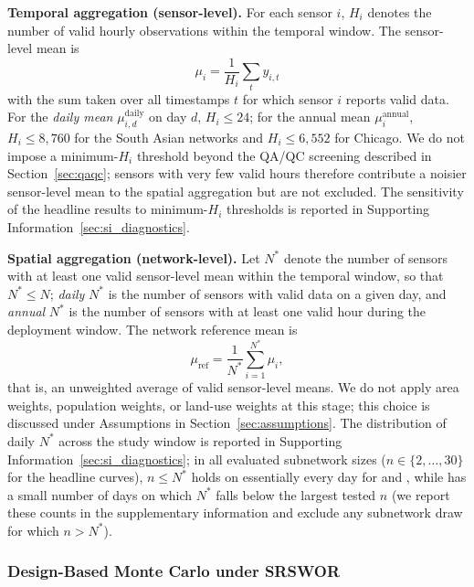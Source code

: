 \documentclass[12pt]{article}
\theoremstyle{remark}
\newcommand{\city}[1]{\capitalisewords{\MakeLowercase{#1}}}
\begin{document}
\textbf{Temporal aggregation (sensor-level).}
For each sensor $i$, $H_i$ denotes the number of valid hourly observations within the temporal window. The sensor-level mean is
\begin{equation}\label{eq:mu_sensor}
\mu_{i} = \frac{1}{H_i} \sum_{t} y_{i,t}
\end{equation}
with the sum taken over all timestamps $t$ for which sensor $i$ reports valid data. For the \emph{daily mean} $\mu_{i,d}^{\mathrm{daily}}$ on day $d$, $H_i \le 24$; for the annual mean $\mu_i^{\mathrm{annual}}$, $H_i \le 8{,}760$ for the South Asian networks and $H_i \le 6{,}552$ for Chicago. We do not impose a minimum-$H_i$ threshold beyond the QA/QC screening described in Section~\ref{sec:qaqc}; sensors with very few valid hours therefore contribute a noisier sensor-level mean to the spatial aggregation but are not excluded. The sensitivity of the headline results to minimum-$H_i$ thresholds is reported in Supporting Information~\ref{sec:si_diagnostics}.

\textbf{Spatial aggregation (network-level).}
Let $N^*$ denote the number of sensors with at least one valid sensor-level mean within the temporal window, so that $N^* \le N$; \emph{daily} $N^*$ is the number of sensors with valid data on a given day, and \emph{annual} $N^*$ is the number of sensors with at least one valid hour during the deployment window. The network reference mean is
\begin{equation}\label{eq:mu_ref}
\mu_{\mathrm{ref}} = \frac{1}{N^*} \sum_{i=1}^{N^*} \mu_{i},
\end{equation}
that is, an unweighted average of valid sensor-level means. We do not apply area weights, population weights, or land-use weights at this stage; this choice is discussed under Assumptions in Section~\ref{sec:assumptions}. The distribution of daily $N^*$ across the study window is reported in Supporting Information~\ref{sec:si_diagnostics}; in all evaluated subnetwork sizes ($n \in \{2, \dots, 30\}$ for the headline curves), $n \le N^*$ holds on essentially every day for \city{Lucknow} and \city{Chicago}, while \city{Dhaka} has a small number of days on which $N^*$ falls below the largest tested $n$ (we report these counts in the supplementary information and exclude any subnetwork draw for which $n > N^*$).

\subsubsection{Design-Based Monte Carlo under SRSWOR}
\label{sec:monte_carlo}
\end{document}
